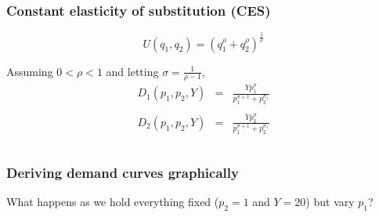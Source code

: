 \documentclass[xcolor=pdftex,dvipsnames]{beamer}
\begin{document}
\begin{frame}
\frametitle{Constant elasticity of substitution (CES)}
\[U(q_1,q_2) = (q_1^\rho+q_2^\rho)^{\frac{1}{\rho}}
\]

Assuming $0<\rho<1$ and letting $\sigma=\frac{1}{\rho-1},$
\[
 \begin{array}{rcl}
D_1(p_1,p_2,Y)&=& \frac{Yp_1^\sigma}{p_1^{\sigma+1} + p_2^{\sigma_1}}\\\\
D_2(p_1,p_2,Y)&=& \frac{Yp_2^\sigma}{p_1^{\sigma+1} + p_2^{\sigma_1}}\\\\
\end{array}
\]

\end{frame}


\begin{frame}
\frametitle{Deriving demand curves graphically}
What happens as we hold everything fixed ($p_2=1$ and $Y=20$) but vary
$p_1$?
\end{frame}
\end{document}
